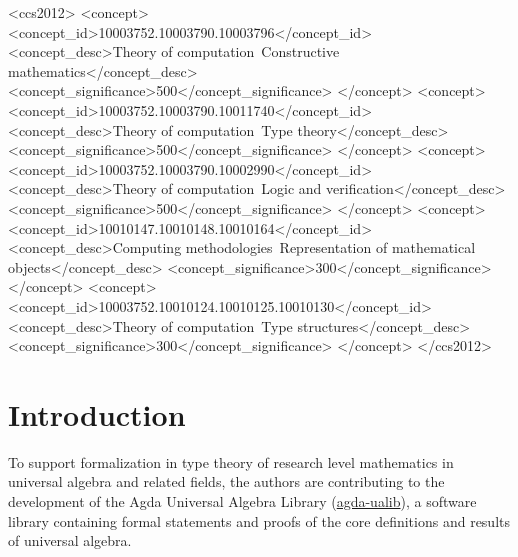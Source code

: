 \documentclass[sigplan,screen]{acmart}
\newcommand{\agdaualib}{\href{https://ualib.org}{agda-ualib}\xspace}
\begin{document}
\begin{CCSXML}
<ccs2012>
   <concept>
       <concept_id>10003752.10003790.10003796</concept_id>
       <concept_desc>Theory of computation~Constructive mathematics</concept_desc>
       <concept_significance>500</concept_significance>
       </concept>
   <concept>
       <concept_id>10003752.10003790.10011740</concept_id>
       <concept_desc>Theory of computation~Type theory</concept_desc>
       <concept_significance>500</concept_significance>
       </concept>
   <concept>
       <concept_id>10003752.10003790.10002990</concept_id>
       <concept_desc>Theory of computation~Logic and verification</concept_desc>
       <concept_significance>500</concept_significance>
       </concept>
   <concept>
       <concept_id>10010147.10010148.10010164</concept_id>
       <concept_desc>Computing methodologies~Representation of mathematical objects</concept_desc>
       <concept_significance>300</concept_significance>
       </concept>
   <concept>
       <concept_id>10003752.10010124.10010125.10010130</concept_id>
       <concept_desc>Theory of computation~Type structures</concept_desc>
       <concept_significance>300</concept_significance>
       </concept>
 </ccs2012>
\end{CCSXML}




\maketitle

\section{Introduction}\label{introduction}
To support formalization in type theory of research level mathematics in universal algebra and related fields, the authors are contributing to the development of the Agda Universal Algebra Library (\agdaualib), a software library containing formal statements and proofs of the core definitions and results of universal algebra.
\end{document}

